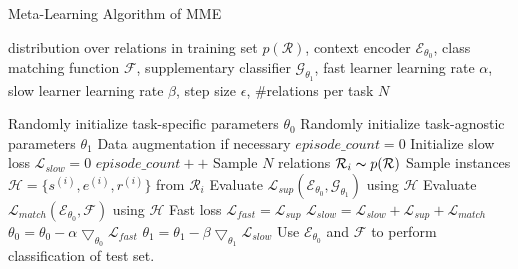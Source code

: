 \begin{algorithm}[h]
\small
\caption{Meta-Learning Algorithm of MME}\label{alg:metal}
distribution over relations in training set $p(\mathcal{R})$,
context encoder $\mathcal{E}_{\theta_0}$,
class matching function $\mathcal{F}$,
supplementary classifier $\mathcal{G}_{\theta_1}$,
fast learner learning rate $\alpha$,
slow learner learning rate $\beta$,
step size $\epsilon$, \#relations per task $N$
\begin{algorithmic}[1]
\State Randomly initialize task-specific parameters $\theta_0$
\State Randomly initialize task-agnostic parameters $\theta_1$
\State Data augmentation if necessary
\label{adddata}
\State $episode\_count=0$
\State Initialize slow loss $\mathcal{L}_{slow}=0$
\State $episode\_count++$
\State Sample $N$ relations $\mathcal{R}_i \thicksim p(\mathcal{R})$
\label{sampler}
\State Sample instances $\mathcal{H}=\{s^{(i)}, e^{(i)}, r^{(i)}\}$ from $\mathcal{R}_i$
\label{samplei}
\State Evaluate $\mathcal{L}_{sup}(\mathcal{E}_{\theta_0}, \mathcal{G}_{\theta_1})$ using $\mathcal{H}$
\label{Lsup}
\State Evaluate $\mathcal{L}_{match}(\mathcal{E}_{\theta_0}, \mathcal{F})$ using $\mathcal{H}$
\State Fast loss $\mathcal{L}_{fast}=\mathcal{L}_{sup}$
\label{fastloss}
\State $\mathcal{L}_{slow} = \mathcal{L}_{slow} + \mathcal{L}_{sup} + \mathcal{L}_{match}$
\label{slowloss}
\State $\theta_0 = \theta_0 - \alpha \bigtriangledown_{\theta_0} \mathcal{L}_{fast}$
\label{fast}
\EndFor
\State $\theta_1 = \theta_1 - \beta \bigtriangledown_{\theta_1} \mathcal{L}_{slow}$
\label{slow}
\EndWhile
\State Use $\mathcal{E}_{\theta_0}$ and $\mathcal{F}$ to perform classification of test set.
\label{test}
\end{algorithmic}
\end{algorithm}

